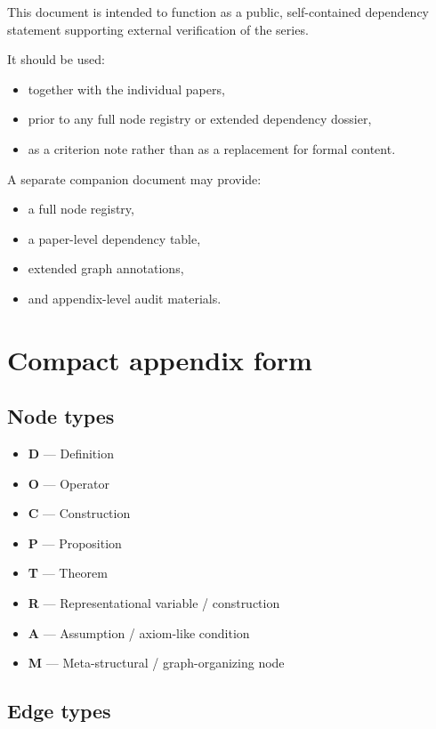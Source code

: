 \documentclass[11pt,a4paper]{article}
\begin{document}
	This document is intended to function as a public, self-contained dependency statement supporting
	external verification of the series.
	
	It should be used:
	\begin{itemize}[leftmargin=2em]
		\item together with the individual papers,
		\item prior to any full node registry or extended dependency dossier,
		\item as a criterion note rather than as a replacement for formal content.
	\end{itemize}
	
	A separate companion document may provide:
	\begin{itemize}[leftmargin=2em]
		\item a full node registry,
		\item a paper-level dependency table,
		\item extended graph annotations,
		\item and appendix-level audit materials.
	\end{itemize}
	
	\section{Compact appendix form}
	
	\subsection*{Node types}
	
	\begin{itemize}[leftmargin=2em]
		\item \textbf{D} --- Definition
		\item \textbf{O} --- Operator
		\item \textbf{C} --- Construction
		\item \textbf{P} --- Proposition
		\item \textbf{T} --- Theorem
		\item \textbf{R} --- Representational variable / construction
		\item \textbf{A} --- Assumption / axiom-like condition
		\item \textbf{M} --- Meta-structural / graph-organizing node
	\end{itemize}
	
	\subsection*{Edge types}
	
\end{document}
